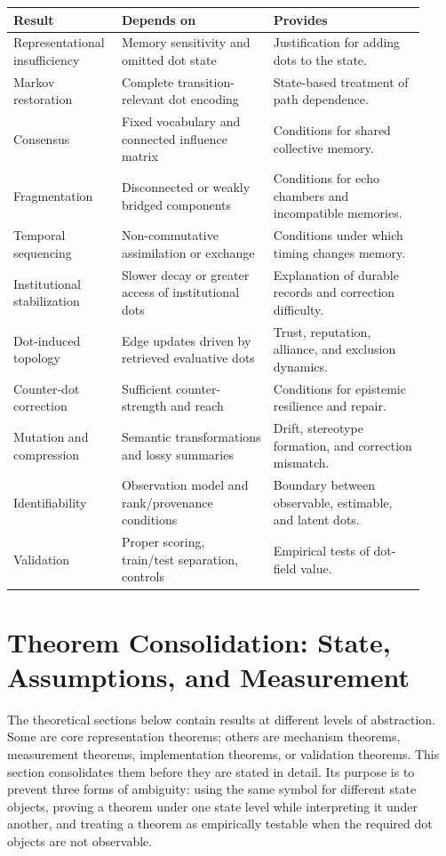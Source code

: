 \documentclass[11pt]{article}
\theoremstyle{remark}
\begin{document}
\begin{longtable}{L{0.22\linewidth}L{0.35\linewidth}L{0.35\linewidth}}
\toprule
\textbf{Result} & \textbf{Depends on} & \textbf{Provides}\\
\midrule
Representational insufficiency & Memory sensitivity and omitted dot state & Justification for adding dots to the state.\\
Markov restoration & Complete transition-relevant dot encoding & State-based treatment of path dependence.\\
Consensus & Fixed vocabulary and connected influence matrix & Conditions for shared collective memory.\\
Fragmentation & Disconnected or weakly bridged components & Conditions for echo chambers and incompatible memories.\\
Temporal sequencing & Non-commutative assimilation or exchange & Conditions under which timing changes memory.\\
Institutional stabilization & Slower decay or greater access of institutional dots & Explanation of durable records and correction difficulty.\\
Dot-induced topology & Edge updates driven by retrieved evaluative dots & Trust, reputation, alliance, and exclusion dynamics.\\
Counter-dot correction & Sufficient counter-strength and reach & Conditions for epistemic resilience and repair.\\
Mutation and compression & Semantic transformations and lossy summaries & Drift, stereotype formation, and correction mismatch.\\
Identifiability & Observation model and rank/provenance conditions & Boundary between observable, estimable, and latent dots.\\
Validation & Proper scoring, train/test separation, controls & Empirical tests of dot-field value.\\
\bottomrule
\end{longtable}


\section{Theorem Consolidation: State, Assumptions, and Measurement}\label{theorem-consolidation-state-assumptions-measurement}

The theoretical sections below contain results at different levels of abstraction. Some are core representation theorems; others are mechanism theorems, measurement theorems, implementation theorems, or validation theorems. This section consolidates them before they are stated in detail. Its purpose is to prevent three forms of ambiguity: using the same symbol for different state objects, proving a theorem under one state level while interpreting it under another, and treating a theorem as empirically testable when the required dot objects are not observable.
\end{document}
